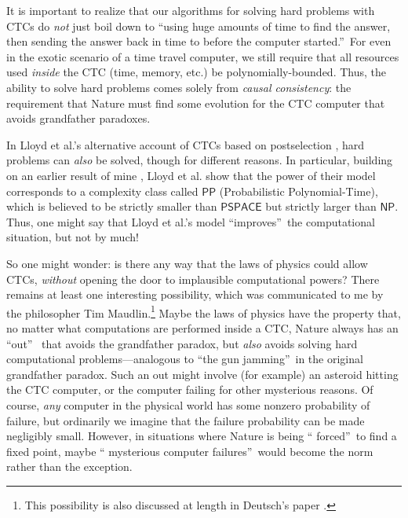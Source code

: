 \documentclass[12pt,onecolumn]{article}%
\begin{document}
It is important to realize that our algorithms for solving hard problems with
CTCs do \textit{not} just boil down to \textquotedblleft using huge amounts of
time to find the answer, then sending the answer back in time to before the
computer started.\textquotedblright\  For even in the exotic scenario of a
time travel computer, we still require that all resources used \textit{inside}
the CTC (time, memory, etc.) be polynomially-bounded. Thus, the ability to
solve hard problems comes solely from \textit{causal consistency}: the
requirement that Nature must find some evolution for the CTC computer that
avoids grandfather paradoxes.

In Lloyd et al.'s alternative account of CTCs based on postselection
\cite{lmggs}, hard problems can \textit{also} be solved, though for different
reasons. In particular, building on an earlier result of mine \cite{aar:pp},
Lloyd et al. show that the power of their model corresponds to a complexity
class called $\mathsf{PP}$ (Probabilistic Polynomial-Time), which is believed
to be strictly smaller than $\mathsf{PSPACE}$ but strictly larger than
$\mathsf{NP}$. Thus, one might say that Lloyd et al.'s model
\textquotedblleft improves\textquotedblright\  the computational situation, but
not by much!

So one might wonder: is there any way that the laws of physics could allow
CTCs, \textit{without} opening the door to implausible computational powers?
 There remains at least one interesting possibility, which was communicated
to me by the philosopher Tim Maudlin.\footnote{This possibility is also
discussed at length in Deutsch's paper \cite{deutsch:ctc}.} Maybe the laws
of physics have the property that, no matter what computations are performed
inside a CTC, Nature always has an \textquotedblleft out\textquotedblright\ %
 that avoids the grandfather paradox, but \textit{also} avoids solving hard
computational problems---analogous to \textquotedblleft the gun
jamming\textquotedblright\  in the original grandfather paradox. Such an
out might involve (for example) an asteroid hitting the CTC computer, or the
computer failing for other mysterious reasons. Of course, \textit{any}
computer in the physical world has some nonzero probability of failure, but
ordinarily we imagine that the failure probability can be made negligibly
small. However, in situations where Nature is being \textquotedblleft
forced\textquotedblright\  to find a fixed point, maybe \textquotedblleft
mysterious computer failures\textquotedblright\  would become the norm rather
than the exception.
\end{document}
